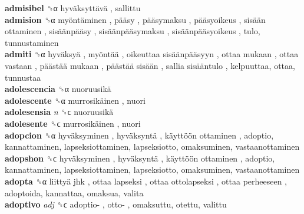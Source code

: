 \textbf{admisibel} ␝α   hyväksyttävä , sallittu  \\
\textbf{admision} ␝α   myöntäminen ,  pääsy ,  pääsymaksu ,  pääsyoikeus ,  sisään ottaminen ,  sisäänpääsy ,  sisäänpääsymaksu ,  sisäänpääsyoikeus , tulo, tunnustaminen  \\
\textbf{admiti} ␝α   hyväksyä ,  myöntää ,  oikeuttaa sisäänpääsyyn ,  ottaa mukaan ,  ottaa vastaan ,  päästää mukaan ,  päästää sisään ,  sallia sisääntulo , kelpuuttaa, ottaa, tunnustaa  \\
\textbf{adolescencia} ␝α   nuoruusikä   \\
\textbf{adolescente} ␝α   murrosikäinen , nuori  \\
\textbf{adolesensia} \emph{n}  ␝ϲ   nuoruusikä   \\
\textbf{adolesente} ␝ϲ   murrosikäinen , nuori  \\
\textbf{adopcion} ␝α   hyväksyminen ,  hyväksyntä ,  käyttöön ottaminen , adoptio, kannattaminen, lapseksiottaminen, lapseksiotto, omaksuminen, vastaanottaminen  \\
\textbf{adopshon} ␝ϲ   hyväksyminen ,  hyväksyntä ,  käyttöön ottaminen , adoptio, kannattaminen, lapseksiottaminen, lapseksiotto, omaksuminen, vastaanottaminen  \\
\textbf{adopta} ␝α   liittyä jhk ,  ottaa lapseksi ,  ottaa ottolapseksi ,  ottaa perheeseen , adoptoida, kannattaa, omaksua, valita  \\
\textbf{adoptivo} \emph{adj}  ␝ϲ   adoptio- ,  otto- , omaksuttu, otettu, valittu  \\

